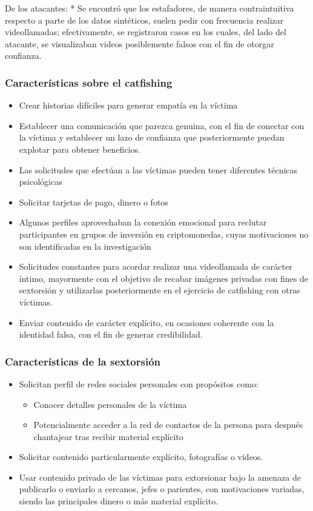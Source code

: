 De los atacantes:
* Se encontró que los estafadores, de manera contraintuitiva respecto a parte de los datos sintéticos, suelen pedir con frecuencia realizar videollamadas; efectivamente, se registraron casos en los cuales, del lado del atacante, se visualizaban videos posiblemente falsos con el fin de otorgar confianza.

\subsubsection{Características sobre el catfishing}

\begin{itemize}
    \item Crear historias difíciles para generar empatía en la víctima
    \item Establecer una comunicación que parezca genuina, con el fin de conectar con la víctima y establecer un lazo de confianza que posteriormente puedan explotar para obtener beneficios.
    \item Las solicitudes que efectúan a las víctimas pueden tener diferentes técnicas psicológicas
    \item Solicitar tarjetas de pago, dinero o fotos
    \item Algunos perfiles aprovechaban la conexión emocional para reclutar participantes en grupos de inversión en criptomonedas, cuyas motivaciones no son identificadas en la investigación
    \item Solicitudes constantes para acordar realizar una videollamada de carácter íntimo, mayormente con el objetivo de recabar imágenes privadas con fines de sextorsión y utilizarlas posteriormente en el ejercicio de catfishing con otras víctimas.
    \item Enviar contenido de carácter explícito, en ocasiones coherente con la identidad falsa, con el fin de generar credibilidad.
\end{itemize}

\subsubsection{Características de la sextorsión} 
\begin{itemize}
    \item Solicitan perfil de redes sociales personales con propósitos como:
        \begin{itemize}
            \item Conocer detalles personales de la víctima
            \item Potencialmente acceder a la red de contactos de la persona para después chantajear tras recibir material explícito
        \end{itemize}
    \item Solicitar contenido particularmente explícito, fotografías o videos.
    \item Usar contenido privado de las víctimas para extorsionar bajo la amenaza de publicarlo o enviarlo a cercanos, jefes o parientes, con motivaciones variadas, siendo las principales dinero o más material explícito.
\end{itemize}

